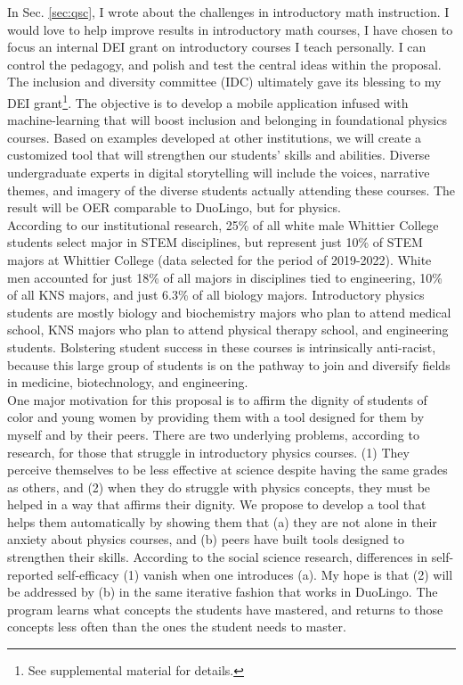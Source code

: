 \documentclass[../../../main.tex]{subfiles}
\begin{document}
\label{sec:dei}

In Sec. \ref{sec:qsc}, I wrote about the challenges in introductory math instruction.  I would love to help improve results in introductory math courses, I have chosen to focus an internal DEI grant on introductory courses I teach personally.  I can control the pedagogy, and polish and test the central ideas within the proposal.  The inclusion and diversity committee (IDC) ultimately gave its blessing to my DEI grant\footnote{See supplemental material for details.}.  The objective is to develop a mobile application infused with machine-learning that will boost inclusion and belonging in foundational physics courses.  Based on examples developed at other institutions, we will create a customized tool that will strengthen our students’ skills and abilities. Diverse undergraduate experts in digital storytelling will include the voices, narrative themes, and imagery of the diverse students actually attending these courses. The result will be OER comparable to DuoLingo, but for physics.
\\
\vspace{0.25cm}
According to our institutional research, 25\% of all white male Whittier College students select major in STEM disciplines, but represent just 10\% of STEM majors at Whittier College (data selected for the period of 2019-2022). White men accounted for just 18\% of all majors in disciplines tied to engineering, 10\% of all KNS majors, and just 6.3\% of all biology majors. Introductory physics students are mostly biology and biochemistry majors who plan to attend medical school, KNS majors who plan to attend physical therapy school, and engineering students. Bolstering student success in these courses is intrinsically anti-racist, because this large group of students is on the pathway to join and diversify fields in medicine, biotechnology, and engineering.
\\
\vspace{0.25cm}
One major motivation for this proposal is to affirm the dignity of students of color and young women by providing them with a tool designed for them by myself and by their peers. There are two underlying problems, according to research, for those that struggle in introductory physics courses. (1) They perceive themselves to be less effective at science despite having the same grades as others, and (2) when they do struggle with physics concepts, they must be helped in a way that affirms their dignity. We propose to develop a tool that helps them automatically by showing them that (a) they are not alone in their anxiety about physics courses, and (b) peers have built tools designed to strengthen their skills. According to the social science research, differences in self-reported self-efficacy (1) vanish when one introduces (a).  My hope is that (2) will be addressed by (b) in the same iterative fashion that works in DuoLingo.  The program learns what concepts the students have mastered, and returns to those concepts less often than the ones the student needs to master.
\end{document}
